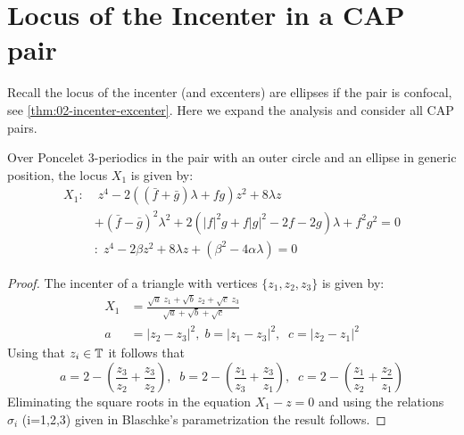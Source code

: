\section{Locus of the Incenter in a CAP pair}
\label{sec:07-proof-theorem}

Recall the locus of the incenter (and excenters) are ellipses if the pair is confocal, see \cref{thm:02-incenter-excenter}. Here we expand the analysis and consider all CAP pairs.

\begin{proposition}
\label{prop:07-X1c}
Over Poncelet 3-periodics in the pair with an outer circle and an ellipse in generic position, the locus $X_1$ is given by:
\begin{align*}
  X_1:&\;z^4 - 2(( \bar{f} + \bar{g}) \lambda +  f g) z^2 + 8   \lambda z\\
  &+ (\bar{f} - \bar{g})^2 \lambda^2 +2 (  |f|^2 g +   f |g|^2 - 2 f - 2 g) \lambda + f^2 g^2=0\\
  \;&:\;  z^4 - 2\beta  z^2+ 8\lambda z+  (\beta^2-4\alpha\lambda) =0
\end{align*}
\end{proposition}

\begin{proof} The incenter of a triangle with vertices $\{z_1,z_2,z_3\}$ is given by:
\begin{align*}
    X_1&=\frac{\sqrt{a}\;z_1+\sqrt{b}\;z_2+\sqrt{c}\;z_3}{\sqrt{a}+\sqrt{b}+\sqrt{c}}\\
    a&=|z_2-z_3|^2, \; b=|z_1-z_3|^2, \;\; c=|z_2-z_1|^2
\end{align*}
Using that $z_i\in \mathbb{T}$ it follows that
\[a=2-(\frac{z_3}{z_2}+\frac{z_3}{z_2}),\;\; b=2-(\frac{z_1}{z_3}+\frac{z_3}{z_1}),\;\;c=2-(\frac{z_1}{z_2}+\frac{z_2}{z_1})\]
Eliminating the square roots in  the equation $X_1-z=0$ and using the relations  $\sigma_i$ (i=1,2,3) given in Blaschke's parametrization the result follows.
\end{proof}

